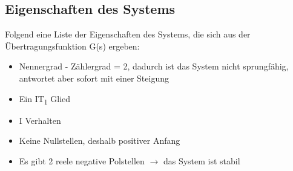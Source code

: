 \subsection{Eigenschaften des Systems}

Folgend eine Liste der Eigenschaften des Systems, die sich aus der Übertragungsfunktion G(s) ergeben:
\begin{itemize}
	\item Nennergrad - Zählergrad = 2, dadurch ist das System nicht sprungfähig, antwortet aber sofort mit einer Steigung
	\item Ein IT\textsubscript{1} Glied
	\item I Verhalten
	\item Keine Nullstellen, deshalb positiver Anfang
	\item Es gibt 2 reele negative Polstellen $\rightarrow$ das System ist stabil
\end{itemize}